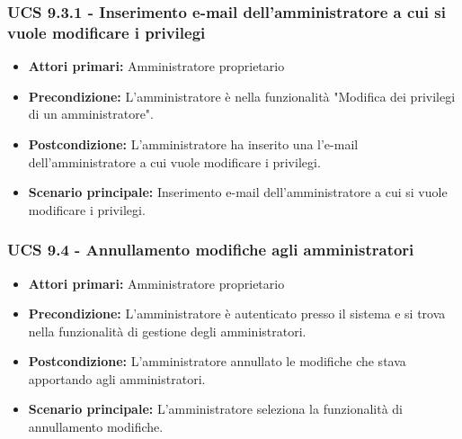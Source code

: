 \subsubsection{UCS 9.3.1 - Inserimento e-mail dell'amministratore a cui si vuole modificare i privilegi}%
\begin{itemize}
\item \textbf{Attori primari:} Amministratore proprietario
\item \textbf{Precondizione:} L'amministratore è nella funzionalità "Modifica dei privilegi di un amministratore".
\item \textbf{Postcondizione:} L'amministratore ha inserito una l'e-mail dell'amministratore a cui vuole modificare i privilegi.
\item \textbf{Scenario principale:} Inserimento e-mail dell'amministratore a cui si vuole modificare i privilegi.
\end{itemize}

\subsubsection{UCS 9.4 - Annullamento modifiche agli amministratori}%

\begin{itemize}
\item \textbf{Attori primari:} Amministratore proprietario
\item \textbf{Precondizione:} L'amministratore è autenticato presso il sistema e si trova nella funzionalità di gestione degli amministratori.
\item \textbf{Postcondizione:} L'amministratore annullato le modifiche che stava apportando agli amministratori.
\item \textbf{Scenario principale:} L'amministratore seleziona la funzionalità di annullamento modifiche.
\end{itemize}